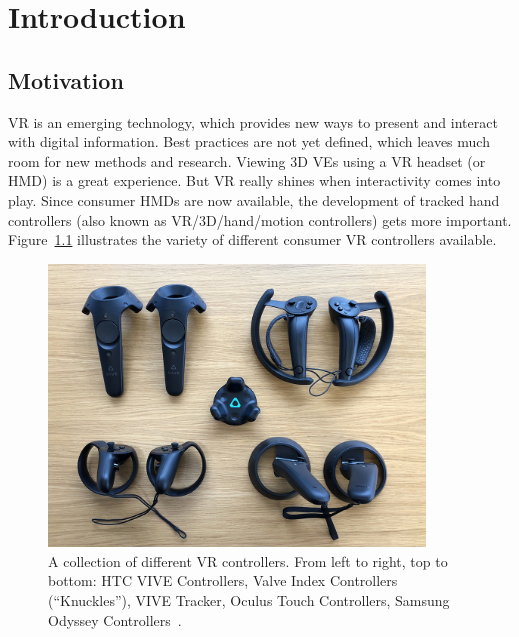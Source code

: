 \chapter{Introduction}\label{chapter:introduction}

\section{Motivation}\label{section:motivation}

\ac{VR} is an emerging technology, which provides new ways to present and interact with digital information. Best practices are not yet defined, which leaves much room for new methods and research. Viewing \ac{3D} \acp{VE} using a \ac{VR} headset (or \ac{HMD}) is a great experience. But \ac{VR} really shines when interactivity comes into play. Since consumer \acp{HMD} are now available, the development of tracked hand controllers (also known as \ac{VR}/\ac{3D}/hand/motion controllers) gets more important. Figure~\ref{fig:vr-controllers} illustrates the variety of different consumer \ac{VR} controllers available.

\begin{figure}[H]%
	\centering%
	\includegraphics[width=10cm]{figures/introduction/vr_controllers.jpg}%
	\caption[Collection of VR controllers]{A collection of different \ac{VR} controllers. From left to right, top to bottom: HTC VIVE Controllers, Valve Index Controllers (\enquote{Knuckles}), VIVE Tracker, Oculus Touch Controllers, Samsung Odyssey Controllers~\cite{Yang.2018}.}\label{fig:vr-controllers}
\end{figure}

